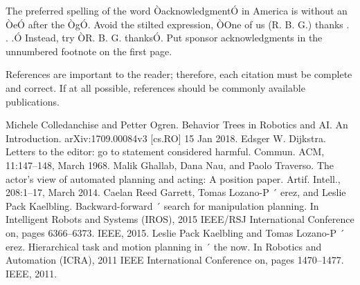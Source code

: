 \documentclass[letterpaper, 10 pt, conference]{ieeeconf}  %
\begin{document}
The preferred spelling of the word ÒacknowledgmentÓ in America is without an ÒeÓ after the ÒgÓ. Avoid the stilted expression, ÒOne of us (R. B. G.) thanks . . .Ó  Instead, try ÒR. B. G. thanksÓ. Put sponsor acknowledgments in the unnumbered footnote on the first page.




References are important to the reader; therefore, each citation must be complete and correct. If at all possible, references should be commonly available publications.



\begin{thebibliography}{99}

 Michele Colledanchise and Petter Ogren. Behavior Trees in Robotics and AI. An Introduction. arXiv:1709.00084v3 [cs.RO] 15 Jan 2018.
 Edsger W. Dijkstra. Letters to the editor: go to statement considered harmful. Commun. ACM, 11:147–148, March 1968.
 Malik Ghallab, Dana Nau, and Paolo Traverso. The actor’s view of automated planning and acting: A position paper. Artif. Intell., 208:1–17, March 2014.
 Caelan Reed Garrett, Tomas Lozano-P ´ erez, and Leslie Pack Kaelbling. Backward-forward ´ search for manipulation planning. In Intelligent Robots and Systems (IROS), 2015 IEEE/RSJ International Conference on, pages 6366–6373. IEEE, 2015.
 Leslie Pack Kaelbling and Tomas Lozano-P ´ erez. Hierarchical task and motion planning in ´ the now. In Robotics and Automation (ICRA), 2011 IEEE International Conference on, pages 1470–1477. IEEE, 2011.





\end{thebibliography}
\end{document}
